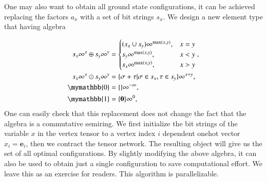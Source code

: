 \documentclass{article}
\newcommand{\<}{\langle}
\renewcommand{\>}{\rangle}
\theoremstyle{definition}\newtheorem{definition}{\textit{Definition}}
\begin{document}
One may also want to obtain all ground state configurations, it can be achieved replacing the factors $a_x$ with a set of bit strings $s_x$.
We design a new element type that having algebra

\begin{align}
\begin{split}
    s_x\infty^x \oplus s_y\infty^y &= \begin{cases}
        (s_x \cup s_y)\infty^{\max(x,y)}, & x = y\\
        s_y\infty^{\max(x,y)}, & x < y\\
        s_x\infty^{\max(x,y)}, & x > y
    \end{cases},\\
    s_x\infty^x \odot s_y\infty^y &= \{\sigma + \tau | \sigma \in s_x, \tau \in s_y\}\infty^{x+y},\\
    \mymathbb{0} &= \{\}\infty^{-\infty},\\
    \mymathbb{1} &= \{\boldsymbol 0\}\infty^{0},
\end{split}
\end{align}
One can easily check that this replacement does not change the fact that the algebra is a commutative semiring.
We first initialize the bit strings of the variable $x$ in the vertex tensor to a vertex index $i$ dependent onehot vector $x_i = \boldsymbol{e}_{i}$,
then we contract the tensor network. The resulting object will give us the set of all optimal configurations.
By slightly modifying the above algebra, it can also be used to obtain just a single configuration to save computational effort.
We leave this as an exercise for readers.
This algorithm is parallelizable.
\end{document}
